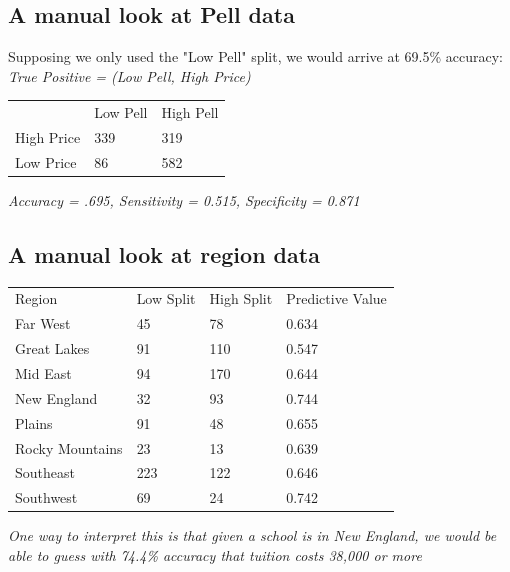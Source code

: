 \documentclass[12pt, a4, epsf] {article}
\theoremstyle{plain}
\theoremstyle{definition}
\begin{document}
\subsection*{A manual look at Pell data}
Supposing we only used the "Low Pell" split, we would arrive at 69.5\% accuracy:\\
\textit{True Positive = (Low Pell, High Price)}
\begin{table}[htbp]
\begin{tabular}{lll}
           & Low Pell & High Pell \\
High Price & 339      & 319       \\
Low Price  & 86       & 582      
\end{tabular}
\end{table}
\FloatBarrier
\textit{Accuracy = .695, Sensitivity = 0.515, Specificity = 0.871}
\subsection*{A manual look at region data}
\begin{table}[htbp]
\begin{tabular}{llll}
Region          & Low Split & High Split & Predictive Value \\
Far West        & 45        & 78         & 0.634            \\
Great Lakes     & 91        & 110        & 0.547            \\
Mid East        & 94        & 170        & 0.644            \\
New England     & 32        & 93         & 0.744            \\
Plains          & 91        & 48         & 0.655            \\
Rocky Mountains & 23        & 13         & 0.639            \\
Southeast       & 223       & 122        & 0.646            \\
Southwest       & 69        & 24         & 0.742           
\end{tabular}
\end{table}
\FloatBarrier
\textit{One way to interpret this is that given a school is in New England, we would be able to guess with 74.4\% accuracy that tuition costs 38,000 or more}
\end{document}

